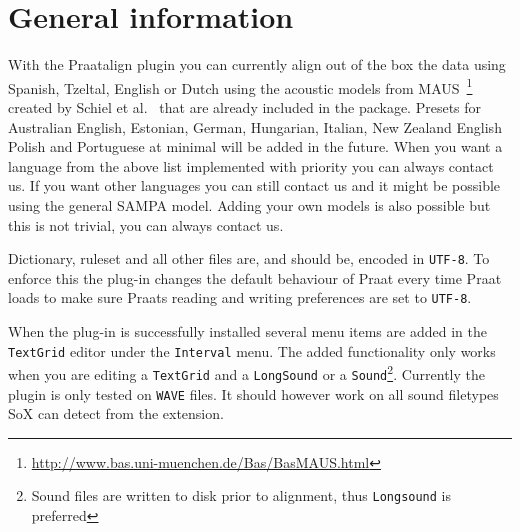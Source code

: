 \section{General information}
With the Praatalign plugin you can currently align out of the box the data
using Spanish, Tzeltal, English or Dutch using the acoustic models from
MAUS~\footnote{\url{http://www.bas.uni-muenchen.de/Bas/BasMAUS.html}} created
by Schiel et al.~\cite{schiel1999} that are already included in the package.
Presets for Australian English, Estonian, German, Hungarian, Italian, New
Zealand English Polish and Portuguese at minimal will be added in the future.
When you want a language from the above list implemented with priority you can
always contact us. If you want other languages you can still contact us and it
might be possible using the general SAMPA model. Adding your own models is also
possible but this is not trivial, you can always contact us.

Dictionary, ruleset and all other files are, and should be, encoded in
\texttt{UTF-8}. To enforce this the plug-in changes the default behaviour of
Praat every time Praat loads to make sure Praats reading and writing
preferences are set to \texttt{UTF-8}.

When the plug-in is successfully installed several menu items are added in the
\texttt{TextGrid} editor under the \texttt{Interval} menu. The added
functionality only works when you are editing a \texttt{TextGrid} and a
\texttt{LongSound} or a \texttt{Sound}\footnote{Sound files are written to disk
prior to alignment, thus \texttt{Longsound} is preferred}. Currently the plugin
is only tested on \texttt{WAVE} files. It should however work on all sound
filetypes SoX can detect from the extension.

